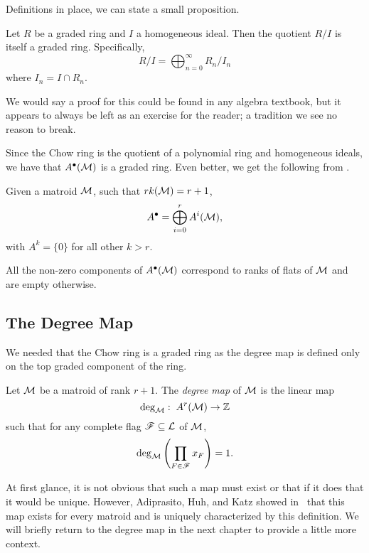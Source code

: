 \documentclass[12pt,oneside]{../../sfsuthesis}
\begin{document}
Definitions in place, we can state a small proposition.
\begin{proposition}
    Let \( R \) be a graded ring and \( I \) a homogeneous ideal.
    Then the quotient \( R/I \) is itself a graded ring.
    Specifically,
    \[
        R/I = \bigoplus_{n=0}^\infty R_n/I_n
    \]
    where \( I_n = I \cap R_n \).
\end{proposition}
We would say a proof for this could be found in any algebra textbook, but it appears to always be left as an exercise for the reader; a tradition we see no reason to break.

Since the Chow ring is the quotient of a polynomial ring and homogeneous ideals, we have that \( A^\bullet(\mathcal{M}) \) is a graded ring.
Even better, we get the following from \cite[Proposition~5.5]{adiprasitoHodgeTheoryCombinatorial2018}.
\begin{proposition}
    Given a matroid \( \mathcal{M} \), such that \( rk(\mathcal{M}) = r + 1 \),
    \[
        A^\bullet = \bigoplus_{i=0}^r A^i(\mathcal{M}),
    \]
    with \( A^k = \{ 0 \} \) for all other \( k > r \).
\end{proposition}
All the non-zero components of \( A^\bullet(\mathcal{M}) \) correspond to ranks of flats of \( \mathcal{M} \) and are empty otherwise.

\subsection{The Degree Map}

We needed that the Chow ring is a graded ring as the degree map is defined only on the top graded component of the ring.
\begin{definition}\label{def:degMap}
    Let \( \mathcal{M} \) be a matroid of rank \( r + 1 \).
    The \emph{degree map} of \( \mathcal{M} \) is the linear map
    \[
        \deg_{\mathcal{M}}:\; A^r(\mathcal{M}) \to \mathbb{Z}
    \]
    such that for any complete flag \( \mathscr{F} \subseteq \mathcal{L} \) of \( \mathcal{M} \),
    \[
        \deg_{\mathcal{M}} \left( \prod_{F \in \mathscr{F}}x_F \right) = 1.
    \]
\end{definition}

At first glance, it is not obvious that such a map must exist or that if it does that it would be unique.
However, Adiprasito, Huh, and Katz showed in~\cite[Proposition~5.6]{adiprasitoHodgeTheoryCombinatorial2018} that this map exists for every matroid and is uniquely characterized by this definition.
We will briefly return to the degree map in the next chapter to provide a little more context.
\end{document}
